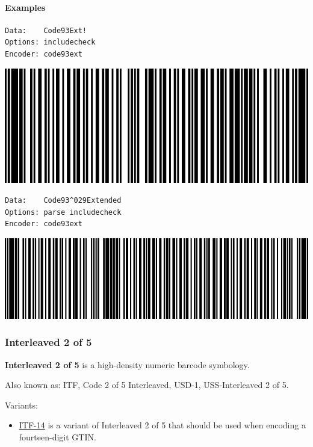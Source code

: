 \hypertarget{examples-18}{%
\paragraph{Examples}\label{examples-18}}

\begin{verbatim}
Data:    Code93Ext!
Options: includecheck
Encoder: code93ext
\end{verbatim}

\includegraphics{images/code93ext-1.eps}

\begin{verbatim}
Data:    Code93^029Extended
Options: parse includecheck
Encoder: code93ext
\end{verbatim}

\includegraphics{images/code93ext-2.eps}

\hypertarget{interleaved-2-of-5}{%
\subsubsection{Interleaved 2 of 5}\label{interleaved-2-of-5}}

\textbf{Interleaved 2 of 5} is a high-density numeric barcode symbology.

Also known as: ITF, Code 2 of 5 Interleaved, USD-1, USS-Interleaved 2 of
5.

Variants:

\begin{itemize}
\tightlist
\item
  \protect\hyperlink{itf-14}{ITF-14} is a variant of Interleaved 2 of 5
  that should be used when encoding a fourteen-digit GTIN.
\end{itemize}

